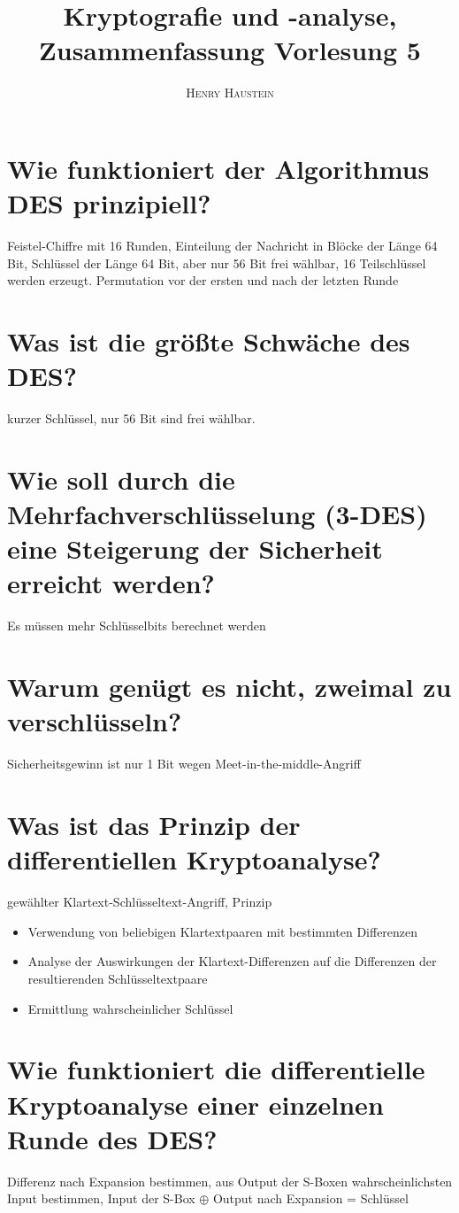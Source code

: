 \documentclass{article}
\title{\textbf{Kryptografie und -analyse, Zusammenfassung Vorlesung 5}}
\author{\textsc{Henry Haustein}}
\date{}
\begin{document}
	\maketitle
	
	\section*{Wie funktioniert der Algorithmus DES prinzipiell?}
	Feistel-Chiffre mit 16 Runden, Einteilung der Nachricht in Blöcke der Länge 64 Bit, Schlüssel der Länge 64 Bit, aber nur 56 Bit frei wählbar, 16 Teilschlüssel werden erzeugt. Permutation vor der ersten und nach der letzten Runde

	\section*{Was ist die größte Schwäche des DES?}
	kurzer Schlüssel, nur 56 Bit sind frei wählbar.
	
	\section*{Wie soll durch die Mehrfachverschlüsselung (3-DES) eine Steigerung der Sicherheit erreicht werden?}
	Es müssen mehr Schlüsselbits berechnet werden
	
	\section*{Warum genügt es nicht, zweimal zu verschlüsseln?}
	Sicherheitsgewinn ist nur 1 Bit wegen Meet-in-the-middle-Angriff
	
	\section*{Was ist das Prinzip der differentiellen Kryptoanalyse?}
	gewählter Klartext-Schlüsseltext-Angriff, Prinzip
	\begin{itemize}
		\item Verwendung von beliebigen Klartextpaaren mit bestimmten Differenzen
		\item Analyse der Auswirkungen der Klartext-Differenzen auf die Differenzen der resultierenden Schlüsseltextpaare
		\item Ermittlung wahrscheinlicher Schlüssel
	\end{itemize}
	
	\section*{Wie funktioniert die differentielle Kryptoanalyse einer einzelnen Runde des DES?}
	Differenz nach Expansion bestimmen, aus Output der S-Boxen wahrscheinlichsten Input bestimmen, Input der S-Box $\oplus$ Output nach Expansion = Schlüssel
	
\end{document}
